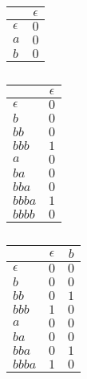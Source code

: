\begin{table}[b]
\centering

\begin{subtable}[h]{.23\textwidth}
\centering
\begin{tabular}{ | l || c | }
\hline
           & $\epsilon$ \\ \hline \hline
$\epsilon$ & $0$        \\ \hline \hline
$a$        & $0$        \\
$b$        & $0$        \\
\hline
\end{tabular}
\caption{} \label{tbl:observation_1}
\end{subtable}
%
%
\hfill
\begin{subtable}[h]{.23\textwidth}
\centering
\begin{tabular}{ | l || c | }
\hline
           & $\epsilon$ \\ \hline \hline
$\epsilon$ & $0$        \\
$b$        & $0$        \\
$bb$       & $0$        \\
$bbb$      & $1$        \\ \hline \hline
$a$        & $0$        \\
$ba$       & $0$        \\
$bba$      & $0$        \\
$bbba$     & $1$        \\
$bbbb$     & $0$        \\
\hline
\end{tabular}
\caption{} \label{tbl:observation_2}
\end{subtable}
%
%
\hfill
\begin{subtable}[h]{.23\textwidth}
\centering
\begin{tabular}{ | l || c | c | }
\hline
           & $\epsilon$ & $b$ \\ \hline \hline
$\epsilon$ & $0$        & $0$ \\
$b$        & $0$        & $0$ \\
$bb$       & $0$        & $1$ \\
$bbb$      & $1$        & $0$ \\ \hline \hline
$a$        & $0$        & $0$ \\
$ba$       & $0$        & $0$ \\
$bba$      & $0$        & $1$ \\
$bbba$     & $1$        & $0$ \\

\end{tabular}
\end{subtable}
\end{table}
